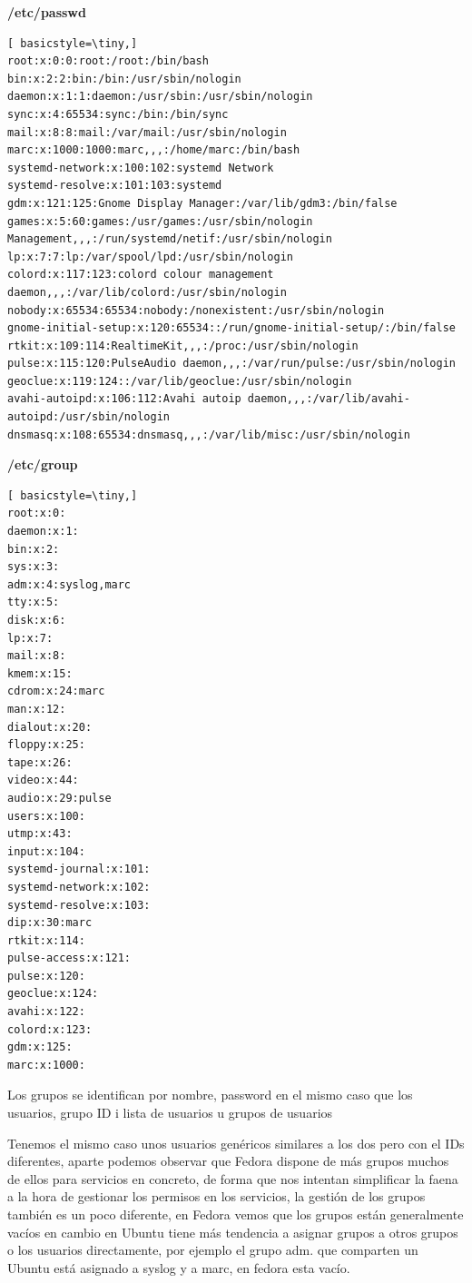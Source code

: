 \documentclass[preprint,11pt]{elsarticle}
\begin{document}
\textbf{/etc/passwd}
\begin{lstlisting}[ basicstyle=\tiny,]
root:x:0:0:root:/root:/bin/bash
bin:x:2:2:bin:/bin:/usr/sbin/nologin
daemon:x:1:1:daemon:/usr/sbin:/usr/sbin/nologin
sync:x:4:65534:sync:/bin:/bin/sync
mail:x:8:8:mail:/var/mail:/usr/sbin/nologin
marc:x:1000:1000:marc,,,:/home/marc:/bin/bash
systemd-network:x:100:102:systemd Network
systemd-resolve:x:101:103:systemd
gdm:x:121:125:Gnome Display Manager:/var/lib/gdm3:/bin/false
games:x:5:60:games:/usr/games:/usr/sbin/nologin
Management,,,:/run/systemd/netif:/usr/sbin/nologin
lp:x:7:7:lp:/var/spool/lpd:/usr/sbin/nologin
colord:x:117:123:colord colour management daemon,,,:/var/lib/colord:/usr/sbin/nologin
nobody:x:65534:65534:nobody:/nonexistent:/usr/sbin/nologin
gnome-initial-setup:x:120:65534::/run/gnome-initial-setup/:/bin/false
rtkit:x:109:114:RealtimeKit,,,:/proc:/usr/sbin/nologin
pulse:x:115:120:PulseAudio daemon,,,:/var/run/pulse:/usr/sbin/nologin
geoclue:x:119:124::/var/lib/geoclue:/usr/sbin/nologin
avahi-autoipd:x:106:112:Avahi autoip daemon,,,:/var/lib/avahi-autoipd:/usr/sbin/nologin
dnsmasq:x:108:65534:dnsmasq,,,:/var/lib/misc:/usr/sbin/nologin
\end{lstlisting}



\textbf{/etc/group}
\begin{multicols}{2}
\begin{lstlisting}[ basicstyle=\tiny,]
root:x:0:
daemon:x:1:
bin:x:2:
sys:x:3:
adm:x:4:syslog,marc
tty:x:5:
disk:x:6:
lp:x:7:
mail:x:8:
kmem:x:15:
cdrom:x:24:marc
man:x:12:
dialout:x:20:
floppy:x:25:
tape:x:26:
video:x:44:
audio:x:29:pulse
users:x:100:
utmp:x:43:
input:x:104:
systemd-journal:x:101:
systemd-network:x:102:
systemd-resolve:x:103:
dip:x:30:marc
rtkit:x:114:
pulse-access:x:121:
pulse:x:120:
geoclue:x:124:
avahi:x:122:
colord:x:123:
gdm:x:125:
marc:x:1000:
\end{lstlisting}
Los grupos se identifican por nombre, password en el mismo caso que los usuarios, grupo ID i lista de usuarios u grupos de usuarios\medskip

Tenemos el mismo caso unos usuarios genéricos similares a los dos pero con el IDs diferentes, aparte podemos observar que Fedora dispone de más grupos muchos de ellos para servicios en concreto, de forma que nos intentan simplificar la faena a la hora de gestionar los permisos en los servicios, la gestión de los grupos también es un poco diferente, en Fedora vemos que los grupos están generalmente vacíos en cambio en Ubuntu tiene más tendencia a asignar grupos a otros grupos o los usuarios directamente, por ejemplo el grupo adm. que comparten un Ubuntu está asignado a syslog y a marc, en fedora esta vacío.
\end{multicols}
\end{document}

